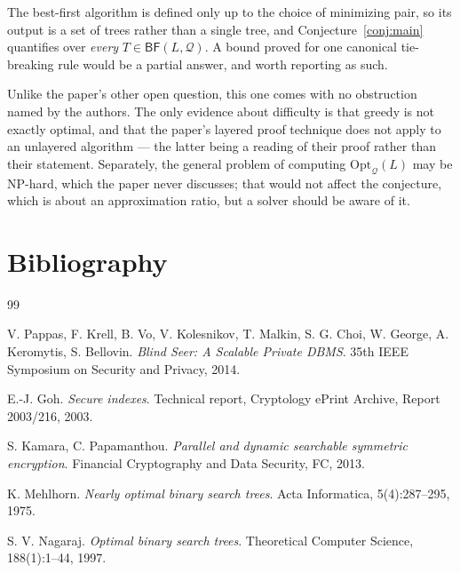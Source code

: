 \documentclass{aicr-conjecture}
\newcommand{\Qd}{\mathcal{Q}}
\newcommand{\Opt}{\mathrm{Opt}}
\newcommand{\BF}{\mathsf{BF}}
\begin{document}
\begin{remark}\label{rem:ties}
The best-first algorithm is defined only up to the choice of minimizing
pair, so its output is a set of trees rather than a single tree, and
Conjecture~\ref{conj:main} quantifies over \emph{every}
$T \in \BF(L,\Qd)$. A bound proved for one canonical tie-breaking rule
would be a partial answer, and worth reporting as such.
\end{remark}

\begin{remark}\label{rem:difficulty}
Unlike the paper's other open question, this one comes with no
obstruction named by the authors. The only evidence about difficulty is
that greedy is not exactly optimal, and that the paper's layered proof
technique does not apply to an unlayered algorithm --- the latter being a
reading of their proof rather than their statement. Separately, the
general problem of computing $\Opt_{\Qd}(L)$ may be NP-hard, which the
paper never discusses; that would not affect the conjecture, which is
about an approximation ratio, but a solver should be aware of it.
\end{remark}

\section{Bibliography}

\begin{aicrbibliography}{99}

V. Pappas, F. Krell, B. Vo, V. Kolesnikov, T. Malkin, S. G. Choi,
W. George, A. Keromytis, S. Bellovin.
\emph{Blind Seer: A Scalable Private DBMS}.
35th IEEE Symposium on Security and Privacy, 2014.

E.-J. Goh.
\emph{Secure indexes}.
Technical report, Cryptology ePrint Archive, Report 2003/216, 2003.

S. Kamara, C. Papamanthou.
\emph{Parallel and dynamic searchable symmetric encryption}.
Financial Cryptography and Data Security, FC, 2013.

K. Mehlhorn.
\emph{Nearly optimal binary search trees}.
Acta Informatica, 5(4):287--295, 1975.

S. V. Nagaraj.
\emph{Optimal binary search trees}.
Theoretical Computer Science, 188(1):1--44, 1997.

\end{aicrbibliography}
\end{document}
